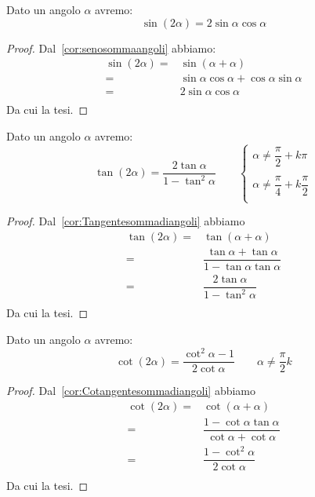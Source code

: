 \begin{thm}\label{thm:Formulediduplicazioneseno}
	Dato un angolo $\alpha$ avremo:
	\[\sin\left(2\alpha\right)=2\sin\alpha\cos\alpha\]
\end{thm}
\begin{proof}
	Dal~\vref{cor:senosommaangoli} abbiamo:
	\begin{align*}
	\sin\left(2\alpha\right)=&\sin\left(\alpha+\alpha\right)\\
	=&\sin\alpha\cos\alpha+\cos\alpha\sin\alpha\\
	=&2\sin\alpha\cos\alpha\\
	\end{align*}
	Da cui la tesi.
\end{proof}
\begin{thm}\label{thm:Formulediduplicazionetangente}
	Dato un angolo $\alpha$ avremo:
	\[\tan\left(2\alpha\right)=\dfrac{2\tan\alpha}{1-\tan^2\alpha}\qquad\begin{cases}
	\alpha\neq\dfrac{\pi}{2}+k\pi\\
	\\
	\alpha\neq\dfrac{\pi}{4}+k\dfrac{\pi}{2}\\
	\end{cases}\]
\end{thm}
\begin{proof}
Dal~\vref{cor:Tangentesommadiangoli} abbiamo
\begin{align*}
\tan\left(2\alpha\right)=&\tan\left(\alpha+\alpha\right)\\
=&\dfrac{\tan\alpha+\tan\alpha}{1-\tan\alpha\tan\alpha}\\
=&\dfrac{2\tan\alpha}{1-\tan^2\alpha}\\
\end{align*}
Da cui la tesi.
\end{proof}
\begin{thm}\label{thm:Formulediduplicazionecotangente}
	Dato un angolo $\alpha$ avremo:
	\[\cot\left(2\alpha\right)=\dfrac{\cot^2\alpha-1}{2\cot\alpha}\qquad\alpha\neq\dfrac{\pi}{2}k\]
\end{thm}
\begin{proof}
	Dal~\vref{cor:Cotangentesommadiangoli} abbiamo
	\begin{align*}
	\cot\left(2\alpha\right)=&\cot\left(\alpha+\alpha\right)\\
	=&\dfrac{1-\cot\alpha\tan\alpha}{\cot\alpha+\cot\alpha}\\
	=&\dfrac{1-\cot^2\alpha}{2\cot\alpha}\\
	\end{align*}
	Da cui la tesi.
\end{proof}
